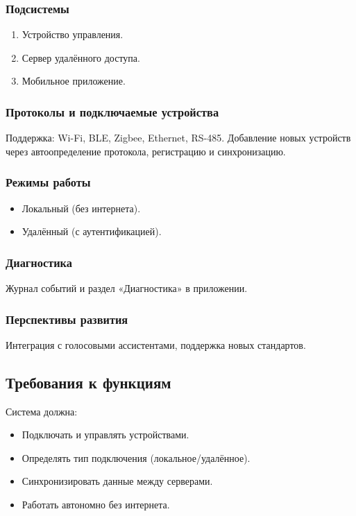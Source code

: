 \documentclass[oneside,a4paper,14pt]{extarticle}
\begin{document}
\subsubsection{Подсистемы}
\begin{enumerate}
    \item Устройство управления.
    \item Сервер удалённого доступа.
    \item Мобильное приложение.
\end{enumerate}

\subsubsection{Протоколы и подключаемые устройства}
Поддержка: Wi-Fi, BLE, Zigbee, Ethernet, RS-485.  
Добавление новых устройств через автоопределение протокола, регистрацию и синхронизацию.

\subsubsection{Режимы работы}
\begin{itemize}
    \item Локальный (без интернета).
    \item Удалённый (с аутентификацией).
\end{itemize}

\subsubsection{Диагностика}
Журнал событий и раздел «Диагностика» в приложении.

\subsubsection{Перспективы развития}
Интеграция с голосовыми ассистентами, поддержка новых стандартов.

\subsection{Требования к функциям}
Система должна:
\begin{itemize}
    \item Подключать и управлять устройствами.
    \item Определять тип подключения (локальное/удалённое).
    \item Синхронизировать данные между серверами.
    \item Работать автономно без интернета.
\end{itemize}
\end{document}
